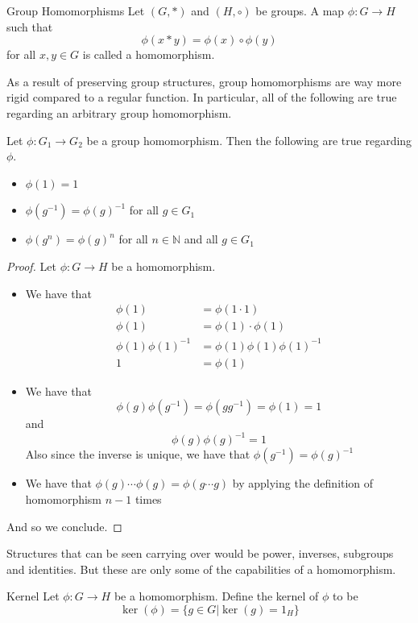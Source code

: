 \documentclass[a4paper]{article}
\begin{document}
\begin{defn}{Group Homomorphisms}{} Let $(G,*)$ and $(H,\circ)$ be groups. A map $\phi:G\to H$ such that $$\phi(x*y)=\phi(x)\circ\phi(y)$$ for all $x,y\in G$ is called a homomorphism. 
\end{defn}

As a result of preserving group structures, group homomorphisms are way more rigid compared to a regular function. In particular, all of the following are true regarding an arbitrary group homomorphism. 

\begin{prp}{}{} Let $\phi:G_1\to G_2$ be a group homomorphism. Then the following are true regarding $\phi$. 
\begin{itemize}
\item $\phi(1)=1$
\item $\phi(g^{-1})=\phi(g)^{-1}$ for all $g\in G_1$
\item $\phi(g^n)=\phi(g)^n$ for all $n\in\mathbb{N}$ and all $g\in G_1$
\end{itemize}\tcbline
\begin{proof} Let $\phi:G\to H$ be a homomorphism. 
\begin{itemize}
\item We have that 
\begin{align*}
\phi(1)&=\phi(1\cdot 1)\\
\phi(1)&=\phi(1)\cdot\phi(1)\\
\phi(1)\phi(1)^{-1}&=\phi(1)\phi(1)\phi(1)^{-1}\\
1&=\phi(1)
\end{align*}
\item We have that $$\phi(g)\phi(g^{-1})=\phi(gg^{-1})=\phi(1)=1$$ and $$\phi(g)\phi(g)^{-1}=1$$ Also since the inverse is unique, we have that $\phi(g^{-1})=\phi(g)^{-1}$
\item We have that $\phi(g)\cdots\phi(g)=\phi(g\cdots g)$ by applying the definition of homomorphism $n-1$ times
\end{itemize}
And so we conclude. 
\end{proof}
\end{prp}

Structures that can be seen carrying over would be power, inverses, subgroups and identities. But these are only some of the capabilities of a homomorphism. 

\begin{defn}{Kernel}{} Let $\phi:G\to H$ be a homomorphism. Define the kernel of $\phi$ to be $$\ker(\phi)=\{g\in G|\ker(g)=1_H\}$$
\end{defn}
\end{document}

